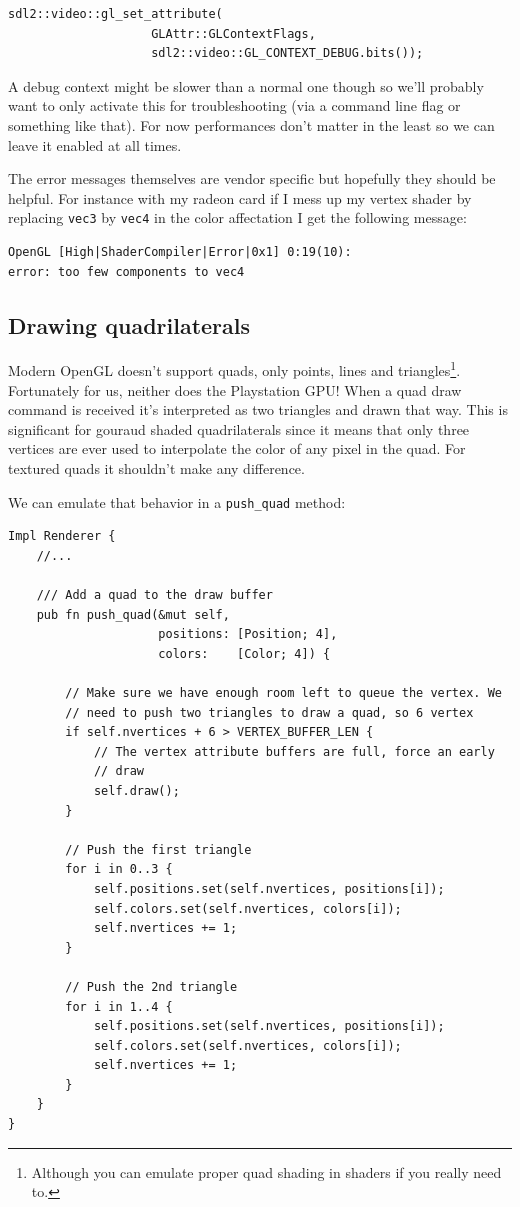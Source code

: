 \documentclass[a4paper]{article}
\newcommand{\code}[1] {\texttt{#1}}
\begin{document}
\begin{lstlisting}
sdl2::video::gl_set_attribute(
                    GLAttr::GLContextFlags,
                    sdl2::video::GL_CONTEXT_DEBUG.bits());
\end{lstlisting}

A debug context might be slower than a normal one though so we'll
probably want to only activate this for troubleshooting (via a command
line flag or something like that). For now performances don't matter
in the least so we can leave it enabled at all times.

The error messages themselves are vendor specific but hopefully they
should be helpful. For instance with my radeon card if I mess up my
vertex shader by replacing \code{vec3} by \code{vec4} in the color
affectation I get the following message:

\begin{verbatim}
OpenGL [High|ShaderCompiler|Error|0x1] 0:19(10):
error: too few components to vec4
\end{verbatim}

\subsection{Drawing quadrilaterals}

Modern OpenGL doesn't support quads, only points, lines and
triangles\footnote{Although you can emulate proper quad shading in
  shaders if you really need to.}. Fortunately for us, neither does
the Playstation GPU! When a quad draw command is received it's
interpreted as two triangles and drawn that way. This is significant
for gouraud shaded quadrilaterals since it means that only three
vertices are ever used to interpolate the color of any pixel in the
quad. For textured quads it shouldn't make any difference.

We can emulate that behavior in a \code{push\_quad} method:

\begin{lstlisting}
Impl Renderer {
    //...

    /// Add a quad to the draw buffer
    pub fn push_quad(&mut self,
                     positions: [Position; 4],
                     colors:    [Color; 4]) {

        // Make sure we have enough room left to queue the vertex. We
        // need to push two triangles to draw a quad, so 6 vertex
        if self.nvertices + 6 > VERTEX_BUFFER_LEN {
            // The vertex attribute buffers are full, force an early
            // draw
            self.draw();
        }

        // Push the first triangle
        for i in 0..3 {
            self.positions.set(self.nvertices, positions[i]);
            self.colors.set(self.nvertices, colors[i]);
            self.nvertices += 1;
        }

        // Push the 2nd triangle
        for i in 1..4 {
            self.positions.set(self.nvertices, positions[i]);
            self.colors.set(self.nvertices, colors[i]);
            self.nvertices += 1;
        }
    }
}
\end{lstlisting}
\end{document}

